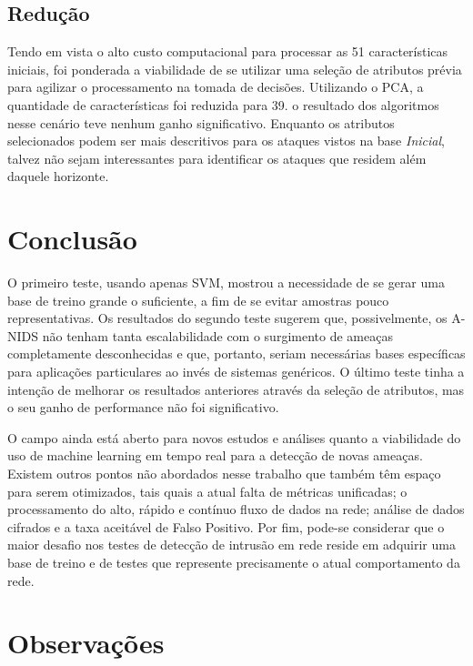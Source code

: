 \documentclass[12pt,a4paper]{article}
\begin{document}
    \subsection{Redução}
    Tendo em vista o alto custo computacional para processar as 51 características iniciais, foi ponderada a viabilidade
    de se utilizar uma seleção de atributos prévia para agilizar o processamento na tomada de decisões. Utilizando o
    PCA, a quantidade de características foi reduzida para 39.
    o resultado dos algoritmos nesse cenário teve nenhum ganho significativo. Enquanto os atributos selecionados podem
    ser mais descritivos para os ataques vistos na base \textit{Inicial}, talvez não sejam interessantes para
    identificar os ataques que residem além daquele horizonte.


\section{Conclusão}
    \par O primeiro teste, usando apenas SVM, mostrou a necessidade de se gerar uma base de treino grande o suficiente, a
    fim de se evitar amostras pouco representativas. Os resultados do segundo teste sugerem que, possivelmente, os A-NIDS
    não tenham tanta escalabilidade com o surgimento de ameaças completamente desconhecidas e que, portanto, seriam
    necessárias bases específicas para aplicações particulares ao invés de sistemas genéricos. O último teste tinha a
    intenção de melhorar os resultados anteriores através da seleção de atributos, mas o seu ganho de performance não foi
    significativo.
    \par O campo ainda está aberto para novos estudos e análises quanto a viabilidade do uso de machine learning em tempo
    real para a detecção de novas ameaças. Existem outros pontos não abordados nesse trabalho que também têm espaço para
    serem otimizados, tais quais a atual falta de métricas unificadas; o processamento do alto, rápido e contínuo fluxo de
    dados na rede; análise de dados cifrados e a taxa aceitável de Falso Positivo. Por fim, pode-se considerar que
     o maior desafio nos testes de detecção de intrusão em rede reside em adquirir uma base de treino e de testes que
 represente precisamente o atual comportamento da rede.


\newpage

\section{Observações}
\end{document}
